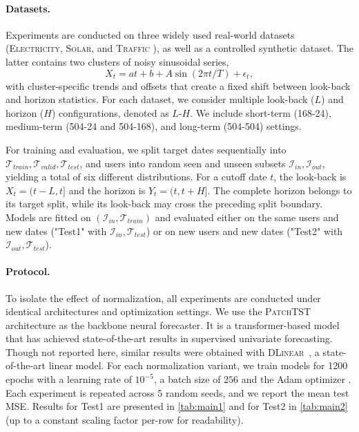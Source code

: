 \paragraph{Datasets.} \label{datasets}
Experiments are conducted on three widely used real-world datasets (\textsc{Electricity}, \textsc{Solar}, and \textsc{Traffic} \citep{lai2018modeling}), as well as a controlled synthetic dataset. The latter contains two clusters of noisy sinusoidal series,
\[
X_t=at+b+A\sin(2\pi t/T)+\epsilon_t,
\]
with cluster-specific trends and offsets that create a fixed shift between
look-back and horizon statistics.
For each dataset, we consider multiple look-back ($L$) and horizon ($H$) configurations, denoted as $L$-$H$. We include short-term (168-24), medium-term (504-24 and 504-168), and long-term (504-504) settings.

For training and evaluation, we split target dates sequentially into $\mathcal{T}_{train},\mathcal{T}_{valid},\mathcal{T}_{test}$, and users into random seen and unseen subsets $\mathcal{I}_{in},\mathcal{I}_{out}$, yielding a total of six different distributions. For a cutoff date $t$, the look-back is $X_t=(t-L,t]$ and the horizon is $Y_t=(t,t+H]$. The complete horizon belongs to its target split, while its look-back may cross the preceding split boundary. Models are fitted on $(\mathcal{I}_{in},\mathcal{T}_{train})$ and evaluated either on the same users and new dates ("Test1" with $\mathcal{I}_{in},\mathcal{T}_{test}$) or on new users and new dates ("Test2" with $\mathcal{I}_{out},\mathcal{T}_{test}$).

\paragraph{Protocol.} To isolate the effect of normalization, all experiments are conducted under identical architectures and optimization settings. We use the \textsc{PatchTST} architecture \citep{patchtst} as the backbone neural forecaster. It is a transformer-based model that has achieved state-of-the-art results in supervised univariate forecasting. Though not reported here, similar results were obtained with \textsc{DLinear}~\citep{dlinear}, a state-of-the-art linear model. For each normalization variant, we train models for 1200 epochs with a learning rate of $10^{-5}$, a batch size of $256$ and the Adam optimizer \citep{adam}. Each experiment is repeated across 5 random seeds, and we report the mean test MSE. Results for Test1 are presented in \cref{tab:main1} and for Test2 in \cref{tab:main2} (up to a constant scaling factor per-row for readability).


